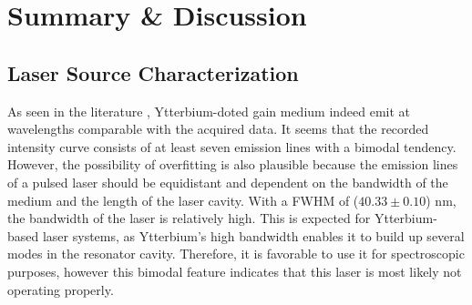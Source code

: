 \section{Summary \& Discussion}
\label{sec:discussion}
\subsection{Laser Source Characterization}
As seen in the literature \cite{Koerner:12}, Ytterbium-doted gain medium indeed emit at wavelengths comparable with the acquired data.
It seems that the recorded intensity curve consists of at least seven emission lines with a bimodal tendency.
However, the possibility of overfitting is also plausible because the emission lines of a pulsed laser should be equidistant and dependent on the bandwidth of the medium and the length of the laser cavity.
With a FWHM of ($40.33 \pm 0.10$) nm, the bandwidth of the laser is relatively high.
This is expected for Ytterbium-based laser systems, as Ytterbium's high bandwidth enables it to build up several modes in the resonator cavity.
Therefore, it is favorable to use it for spectroscopic purposes, however this bimodal feature indicates that this laser is most likely not operating properly.


